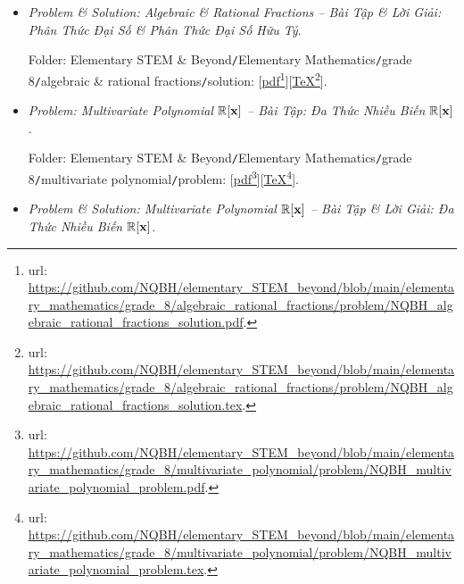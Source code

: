 \documentclass[12pt]{article}
\begin{document}
\begin{itemize}
	Folder: {\sf Elementary STEM \& Beyond{\tt/}Elementary Mathematics{\tt/}grade 8{\tt/}algebraic \& rational fractions{\tt/}problem}: [\href{https://github.com/NQBH/elementary_STEM_beyond/blob/main/elementary_mathematics/grade_8/algebraic_rational_fractions/problem/NQBH_algebraic_rational_fractions_problem.pdf}{pdf}\footnote{{\sc url}: \url{https://github.com/NQBH/elementary_STEM_beyond/blob/main/elementary_mathematics/grade_8/algebraic_rational_fractions/problem/NQBH_algebraic_rational_fractions_problem.pdf}.}][\href{https://github.com/NQBH/elementary_STEM_beyond/blob/main/elementary_mathematics/grade_8/algebraic_rational_fractions/problem/NQBH_algebraic_rational_fractions_problem.tex}{\TeX}\footnote{{\sc url}: \url{https://github.com/NQBH/elementary_STEM_beyond/blob/main/elementary_mathematics/grade_8/algebraic_rational_fractions/problem/NQBH_algebraic_rational_fractions_problem.tex}.}].
	\item {\it Problem \& Solution: Algebraic \& Rational Fractions -- Bài Tập \& Lời Giải: Phân Thức Đại Số \& Phân Thức Đại Số Hữu Tỷ}.
	
	Folder: {\sf Elementary STEM \& Beyond{\tt/}Elementary Mathematics{\tt/}grade 8{\tt/}algebraic \& rational fractions{\tt/}solution}: [\href{https://github.com/NQBH/elementary_STEM_beyond/blob/main/elementary_mathematics/grade_8/algebraic_rational_fractions/problem/NQBH_algebraic_rational_fractions_solution.pdf}{pdf}\footnote{{\sc url}: \url{https://github.com/NQBH/elementary_STEM_beyond/blob/main/elementary_mathematics/grade_8/algebraic_rational_fractions/problem/NQBH_algebraic_rational_fractions_solution.pdf}.}][\href{https://github.com/NQBH/elementary_STEM_beyond/blob/main/elementary_mathematics/grade_8/algebraic_rational_fractions/problem/NQBH_algebraic_rational_fractions_solution.tex}{\TeX}\footnote{{\sc url}: \url{https://github.com/NQBH/elementary_STEM_beyond/blob/main/elementary_mathematics/grade_8/algebraic_rational_fractions/problem/NQBH_algebraic_rational_fractions_solution.tex}.}].
	\item {\it Problem: Multivariate Polynomial $\mathbb{R}[{\bf x}]$ -- Bài Tập: Đa Thức Nhiều Biến $\mathbb{R}[{\bf x}]$}.
	
	Folder: {\sf Elementary STEM \& Beyond{\tt/}Elementary Mathematics{\tt/}grade 8{\tt/}multivariate polynomial{\tt/}problem}: [\href{https://github.com/NQBH/elementary_STEM_beyond/blob/main/elementary_mathematics/grade_8/multivariate_polynomial/problem/NQBH_multivariate_polynomial_problem.pdf}{pdf}\footnote{{\sc url}: \url{https://github.com/NQBH/elementary_STEM_beyond/blob/main/elementary_mathematics/grade_8/multivariate_polynomial/problem/NQBH_multivariate_polynomial_problem.pdf}.}][\href{https://github.com/NQBH/elementary_STEM_beyond/blob/main/elementary_mathematics/grade_8/multivariate_polynomial/problem/NQBH_multivariate_polynomial_problem.tex}{\TeX}\footnote{{\sc url}: \url{https://github.com/NQBH/elementary_STEM_beyond/blob/main/elementary_mathematics/grade_8/multivariate_polynomial/problem/NQBH_multivariate_polynomial_problem.tex}.}].
	\item {\it Problem \& Solution: Multivariate Polynomial $\mathbb{R}[{\bf x}]$ -- Bài Tập \& Lời Giải: Đa Thức Nhiều Biến $\mathbb{R}[{\bf x}]$}.
		

\end{itemize}
\end{document}
